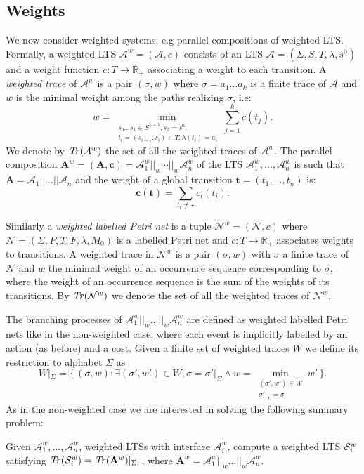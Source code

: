 \documentclass{llncs}
\def\A{\mathcal{A}}
\def\prod{\mathbf{A}}
\def\t{\mathbf{t}}
\def\N{\mathcal{N}}
\def\S{\mathcal{S}}
\newcommand{\Tr}[1]{{\it Tr}(#1)}
\renewcommand{\S}{{\cal S}}
\def\R{\mathbb{R}_+}
\begin{document}
\subsection{Weights}
We now consider weighted systems, e.g parallel compositions of weighted LTS.
Formally, a weighted LTS $\A^w=(\A,c)$ consists of an LTS $\A=(\Sigma,S,T,\lambda,s^0)$ and a weight function $c:T\rightarrow \R$ associating a weight to each transition.
A \emph{weighted trace} of $\A^w$ is a pair $(\sigma,w)$ where $\sigma=a_1\dots a_k$ is a finite trace of $\A$ and $w$ is the minimal weight among the paths realizing $\sigma$, i.e:
$$w=\min_{\substack{
s_0\dots s_k\in S^{k+1}, s_0=s^0,\\
t_i=(s_{i-1},s_i)\in T, \lambda(t_i)=a_i}}\sum_{j=1}^kc(t_j).$$
We denote by $\Tr{\A^w}$ the set of all the weighted traces of $\A^w$.
The parallel composition $\prod^w=(\prod,\mathbf{c})=\A^w_1\mathbin{||_w}\cdots\mathbin{||_w}\A^w_n$ of the LTS $\A^w_1,\dots,\A^w_n$ is such that $\prod=\A_1||\dots||\A_n$ and the weight of a global transition $\t=(t_1,\dots,t_n)$ is: 
$$\mathbf{c}(\t)=\sum_{t_i\neq\star}c_i(t_i).$$

Similarly a \emph{weighted labelled Petri net} is a tuple $\N^w=(\N,c)$ where $\N=(\Sigma,P,T,F,\lambda,M_0)$ is a labelled Petri net and $c:T\rightarrow\R$ associates weights to transitions.
A weighted trace in $\N^w$ is a pair $(\sigma,w)$ with $\sigma$ a finite trace of $\N$ and $w$ the minimal weight of an occurrence sequence corresponding to $\sigma$, where the weight of an occurrence sequence is the sum of the weights of its transitions.
By $\Tr{\N^w}$ we denote the set of all the weighted traces of $\N^w$.

The branching processes of $\A_1^w||_w\dots||_w\A_n^w$ are defined as weighted labelled Petri nets like in the non-weighted case, where
each event is implicitly labelled by an action (as before) and a cost.
Given a finite set of weighted traces $W$ we define its restriction to alphabet $\Sigma$ as 
$$W|_{\Sigma}=\{\,(\sigma,w)\mathrel{:}\exists(\sigma',w')\in W, \sigma=\sigma'|_{\Sigma} \wedge w=\min_{\substack{(\sigma',w')\in W\\ \sigma'|_{\Sigma}=\sigma}} w'\,\}.$$
As in the non-weighted case we are interested in solving the following summary problem:
\begin{definition}
Given $\A^w_1,\dots,\A^w_n$, weighted LTSs with interface $\A^w_i$, compute a weighted LTS $\S_i^w$ satisfying $\Tr{\S_i^w}=\Tr{\prod^w}|_{\Sigma_i}$, where $\prod^w=\A_1^w||_w\dots||_w\A_n^w$.
\end{definition}
\end{document}
